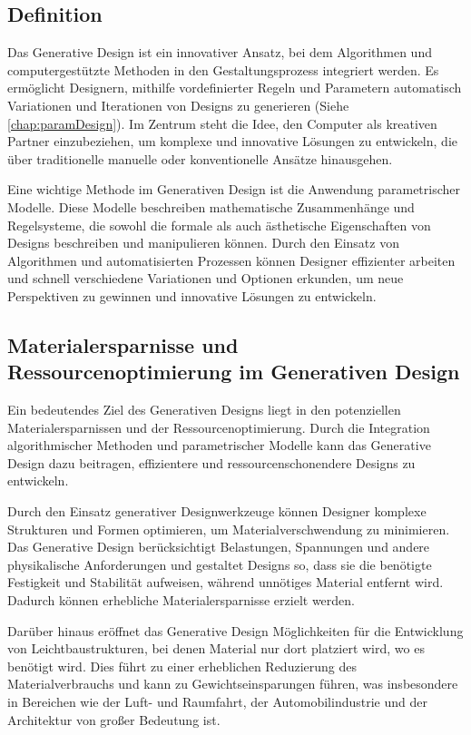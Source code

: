 \subsection*{Definition}
Das Generative Design ist ein innovativer Ansatz, bei dem Algorithmen und computergestützte Methoden in den Gestaltungsprozess integriert werden. Es ermöglicht Designern, mithilfe vordefinierter Regeln und Parametern automatisch Variationen und Iterationen von Designs zu generieren (Siehe \autoref{chap:paramDesign}). Im Zentrum steht die Idee, den Computer als kreativen Partner einzubeziehen, um komplexe und innovative Lösungen zu entwickeln, die über traditionelle manuelle oder konventionelle Ansätze hinausgehen.

Eine wichtige Methode im Generativen Design ist die Anwendung parametrischer Modelle. Diese Modelle beschreiben mathematische Zusammenhänge und Regelsysteme, die sowohl die formale als auch ästhetische Eigenschaften von Designs beschreiben und manipulieren können. Durch den Einsatz von Algorithmen und automatisierten Prozessen können Designer effizienter arbeiten und schnell verschiedene Variationen und Optionen erkunden, um neue Perspektiven zu gewinnen und innovative Lösungen zu entwickeln.

\subsection*{Materialersparnisse und Ressourcenoptimierung im Generativen Design}
Ein bedeutendes Ziel des Generativen Designs liegt in den potenziellen Materialersparnissen und der Ressourcenoptimierung. Durch die Integration algorithmischer Methoden und parametrischer Modelle kann das Generative Design dazu beitragen, effizientere und ressourcenschonendere Designs zu entwickeln.

Durch den Einsatz generativer Designwerkzeuge können Designer komplexe Strukturen und Formen optimieren, um Materialverschwendung zu minimieren. Das Generative Design berücksichtigt Belastungen, Spannungen und andere physikalische Anforderungen und gestaltet Designs so, dass sie die benötigte Festigkeit und Stabilität aufweisen, während unnötiges Material entfernt wird. Dadurch können erhebliche Materialersparnisse erzielt werden.

Darüber hinaus eröffnet das Generative Design Möglichkeiten für die Entwicklung von Leichtbaustrukturen, bei denen Material nur dort platziert wird, wo es benötigt wird. Dies führt zu einer erheblichen Reduzierung des Materialverbrauchs und kann zu Gewichtseinsparungen führen, was insbesondere in Bereichen wie der Luft- und Raumfahrt, der Automobilindustrie und der Architektur von großer Bedeutung ist.

